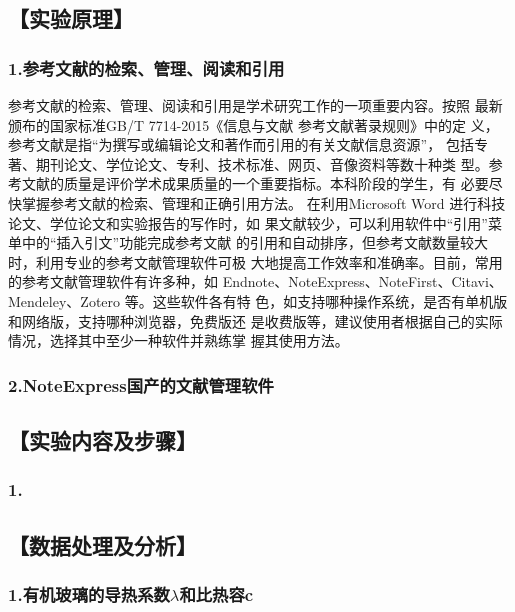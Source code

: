 \documentclass[12pt,a4paper]{article}
\begin{document}
\subsection*{【实验原理】}

	\subsubsection*{1.参考文献的检索、管理、阅读和引用}
		参考文献的检索、管理、阅读和引用是学术研究工作的一项重要内容。按照
	最新颁布的国家标准GB/T 7714-2015《信息与文献 参考文献著录规则》中的定
	义，参考文献是指“为撰写或编辑论文和著作而引用的有关文献信息资源”\cite{bandyopadhyay_physics_2009}，
	包括专著、期刊论文、学位论文、专利、技术标准、网页、音像资料等数十种类
	型。参考文献的质量是评价学术成果质量的一个重要指标。本科阶段的学生，有
	必要尽快掌握参考文献的检索、管理和正确引用方法。\cite{gonzalez-garcia_phenomenology_2008}
	在利用Microsoft Word 进行科技论文、学位论文和实验报告的写作时，如
	果文献较少，可以利用软件中“引用”菜单中的“插入引文”功能完成参考文献
	的引用和自动排序，但参考文献数量较大时，利用专业的参考文献管理软件可极
	大地提高工作效率和准确率。目前，常用的参考文献管理软件有许多种\cite{meloni_sterile_2010}，如
	Endnote、NoteExpress、NoteFirst、Citavi、Mendeley、Zotero 等。这些软件各有特
	色，如支持哪种操作系统，是否有单机版和网络版，支持哪种浏览器\cite{tang_neutrino_2010}，免费版还
	是收费版等，建议使用者根据自己的实际情况，选择其中至少一种软件并熟练掌
	握其使用方法。\cite{tang_requirements_2012}


	\subsubsection*{2.NoteExpress国产的文献管理软件}


\subsection*{【实验内容及步骤】}
	\subsubsection*{1.}



\subsection*{【数据处理及分析】}

	\subsubsection*{1.有机玻璃的导热系数$\lambda$和比热容c}
\end{document}
